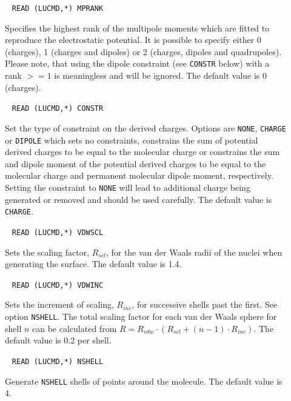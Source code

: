 \begin{description}
\item[]\verb| |\newline
\verb|READ (LUCMD,*) MPRANK|

Specifies the highest rank of the multipole moments which are fitted to reproduce the electrostatic potential. It is possible to specify either 0 (charges), 1 (charges and dipoles) or 2 (charges, dipoles and quadrupoles). Please note, that using the dipole constraint (see \verb|CONSTR| below) with a rank $>=1$ is meaningless and will be ignored. The default value is 0 (charges).

\item[]\verb| |\newline
\verb|READ (LUCMD,*) CONSTR|

Set the type of constraint on the derived charges. Options are \verb|NONE|, \verb|CHARGE| or \verb|DIPOLE| which sets no constraints, constrains the sum of potential derived charges to be equal to the molecular charge or constrains the sum and dipole moment of the potential derived charges to be equal to the molecular charge and permanent molecular dipole moment, respectively. Setting the constraint to \verb|NONE| will lead to additional charge being generated or removed and should be used carefully. The default value is \verb|CHARGE|.

\item[]\verb| |\newline
\verb|READ (LUCMD,*) VDWSCL|

Sets the scaling factor, $R_{scl}$, for the van der Waals radii of the nuclei when generating the surface. The default value is 1.4.

\item[]\verb| |\newline
\verb|READ (LUCMD,*) VDWINC|

Sets the increment of scaling, $R_{inc}$, for successive shells past the first. See option \verb|NSHELL|. The total scaling factor for each van der Waals sphere for shell $n$ can be calculated from $R = R_{vdw}\cdot (R_{scl}+(n-1)\cdot R_{inc})$. The default value is 0.2 \angstrom{} per shell.

\item[]\verb| |\newline
\verb|READ (LUCMD,*) NSHELL|

Generate \verb|NSHELL| shells of points around the molecule. The default value is 4.


\end{description}
